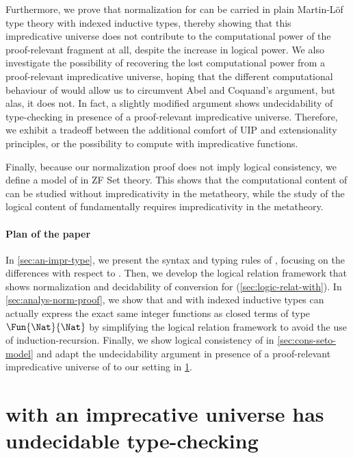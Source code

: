 %
Furthermore, we prove that normalization for \SetoidCC can be
carried in plain Martin-Löf type theory with indexed inductive types,
thereby showing that this impredicative universe does not contribute
to the computational power of the proof-relevant fragment at all,
despite the increase in logical power.
%
We also investigate the possibility of recovering the lost computational power
from a proof-relevant impredicative universe, hoping that the different
computational behaviour of \SetoidCC would allow us to circumvent Abel and
Coquand's argument, but alas, it does not. In fact, a slightly modified
argument shows undecidability of type-checking in presence of a
proof-relevant impredicative universe.
%
Therefore, we exhibit a tradeoff between the additional comfort of
UIP and extensionality principles, or the possibility to compute with
impredicative functions.

Finally, because our normalization proof does not imply logical
consistency, we define a model of \SetoidCC in ZF Set
theory.
%
This shows that the computational content of \SetoidCC can be studied
without impredicativity in the metatheory, while the study of the
logical content of \SetoidCC fundamentally requires impredicativity in
the metatheory.

\paragraph{Plan of the paper}

In \cref{sec:an-impr-type}, we present the syntax and typing rules of
\SetoidCC, focusing on the differences with respect to \SetoidTT.
%
Then, we develop the logical relation
framework that shows normalization and decidability of conversion for
\SetoidCC (\cref{sec:logic-relat-with}).
%
In \cref{sec:analys-norm-proof}, we show that \SetoidCC and \MLTT with
indexed inductive types can
actually express the exact same integer functions
  as closed terms of type \( \Fun{\Nat}{\Nat} \) by simplifying the
  logical relation framework to avoid the use of induction-recursion.
  Finally, we show logical consistency of \SetoidCC in
  \cref{sec:cons-seto-model} and adapt the undecidability argument in
  presence of a proof-relevant impredicative universe of
   to our setting in \cref{sec:setoidcc-with-an}.

  \section{\SetoidCC with an imprecative universe has undecidable type-checking}
  \label{sec:setoidcc-with-an}
  
